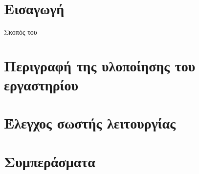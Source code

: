\documentclass[a4paper,12pt]{article}
\begin{document}


\newpage
\tableofcontents
\newpage

\section{Εισαγωγή}
Σκοπός του


\section{Περιγραφή της υλοποίησης του εργαστηρίου}






\section{Έλεγχος σωστής λειτουργίας}



\section{Συμπεράσματα}
\end{document}
